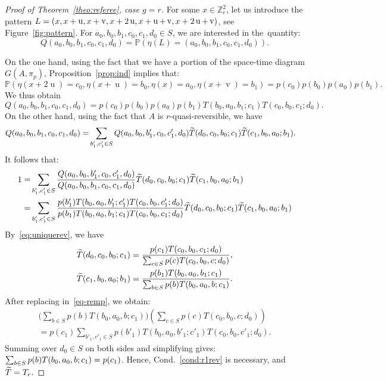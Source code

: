 \documentclass[10pt]{amsart}
\theoremstyle{definition}\newtheorem{defi}[theo]{Definition}\newtheorem{rema}[theo]{Remark}\newtheorem{exam}[theo]{Example}\newtheorem{exem}[theo]{Example}\newtheorem{nota}[theo]{Notation}
\let\oldtilde\tilde
\renewcommand*{\tilde}[1]{\mathchoice{\widetilde{#1}}{\widetilde{#1}}{\oldtilde{#1}}{\oldtilde{#1}}}
\newcounter{a}
\newcommand{\Cond}{Cond.}
\newcommand{\Z}{\mathbb{Z}}
\newcommand{\Pbb}{\mathbb{P}}
\DeclareMathOperator{\vu}{u}
\DeclareMathOperator{\vv}{v}
\begin{document}
\begin{proof}[Proof of Theorem~\ref{theo:referee}, case $g=r$]
For some $x \in \Z_{e}^2$, let us introduce the pattern $L=(x,x+\vu,x+\vv,x+2\vu,\linebreak x+\vu+\vv,x+2\vu+\vv)$, see Figure~\ref{fig:pattern}. For $a_0,b_0,b_1,c_0,c_1,d_0 \in S$, we are interested in the~quantity:
\[
Q(a_0,b_0,b_1,c_0,c_1,d_0)=\Pbb\left(\eta(L)=(a_0,b_0,b_1,c_0,c_1,d_0)\right).
\]

On the one hand, using the fact that we have a portion of the space-time diagram $G(A,\pi_p)$, Proposition~\ref{prop:ind} implies that:
\[
\Pbb\left(\eta(x + 2 \vu) = c_0, \eta(x + \vu) = b_0, \eta(x) = a_0, \eta(x + \vv) = b_1\right)=p(c_0) p(b_0) p(a_0) p(b_1).
\]
We thus obtain
\[
Q(a_0,b_0,b_1,c_0,c_1,d_0)= p(c_0) p(b_0) p(a_0) p(b_1) T(b_0,a_0,b_1;c_1) T(c_0,b_0,c_1;d_0).
\]
On the other hand, using the fact that $A$ is $r$-quasi-reversible, we have
\begin{align*}
Q(a_0,b_0,b_1,c_0,c_1,d_0)=&\sum_{b'_1,c'_1\in S}Q(a_0,b_0,b'_1,c_0,c'_1,d_0)\tilde T(d_0,c_0,b_0;c_1)\tilde T(c_1,b_0,a_0;b_1).
\end{align*}
It follows that:
\begin{equation}\label{eq-remp}
\begin{aligned}
1=&\sum_{b'_1,c'_1\in S}\frac{Q(a_0,b_0,b'_1,c_0,c'_1,d_0)}{Q(a_0,b_0,b_1,c_0,c_1,d_0)}\tilde T(d_0,c_0,b_0;c_1)\tilde T(c_1,b_0,a_0;b_1) \\
=&\sum_{b'_1,c'_1\in S} \frac{p(b'_1) T(b_0,a_0,b'_1;c'_1) T(c_0,b_0,c'_1;d_0)}{p(b_1) T(b_0,a_0,b_1;c_1) T(c_0,b_0,c_1;d_0)}\tilde T(d_0,c_0,b_0;c_1)\tilde T(c_1,b_0,a_0;b_1) 
\end{aligned}
\end{equation}
By~\eqref{eq:uniquerev}, we have
\begin{align*}
\tilde T(d_0,c_0,b_0;c_1)=\frac{p(c_1)T(c_0,b_0,c_1;d_0)}{\sum_{c\in S} p(c) T(c_0,b_0,c;d_0)},\\
\tilde T(c_1,b_0,a_0;b_1)=\frac{p(b_1)T(b_0,a_0,b_1;c_1)}{\sum_{b\in S} p(b)T(b_0,a_0,b;c_1)}.
\end{align*}
After replacing in~\eqref{eq-remp}, we obtain:
\begin{multline*}
\bigg(\sum_{b\in S} p(b)T(b_0,a_0,b;c_1)\bigg) \left(\sum_{c\in S}p(c) T(c_0,b_0,c;d_0)\right)\\=p(c_1)\sum_{b'_1,c'_1\in S} p(b'_1)T(b_0,a_0,b'_1;c'_1)T(c_0,b_0,c'_1;d_0).
\end{multline*}
Summing over $d_0\in S$ on both sides and simplifying gives: $\sum_{b\in S} p(b)T(b_0,a_0,b;\linebreak c_1)=p(c_1)$. Hence, \Cond~\ref{cond:r1rev} is necessary, and $\tilde T=T_r$.




\end{proof}
\end{document}

